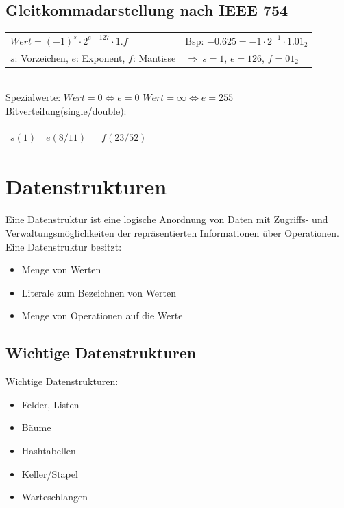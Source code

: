 \documentclass[10pt,a4paper]{scrartcl}
\newcommand{\Ra}[0]{\ensuremath{\Rightarrow}}									%
\begin{document}
	\subsection{Gleitkommadarstellung nach IEEE 754}
	\begin{tabular}{l|l}
		$Wert = (-1)^s \cdot 2^{e-127} \cdot 1.f$ & Bsp: $-0.625 = -1 \cdot 2^{-1} \cdot 1.01_2$\\
		$s$: Vorzeichen, $e$: Exponent, $f$: Mantisse & $\Ra\ s = 1$, $e = 126$, $f = 01_2$\\ 
	\end{tabular}
	\\[0.5em]
	Spezialwerte: $Wert = 0 \Leftrightarrow e=0$ \qquad $Wert = \infty \Leftrightarrow e=255$ \\
	Bitverteilung(single/double):\\
	\begin{tabular}{|c|c|c|} \hline 
		$s(1)$ & \quad $e(8/11)$ \quad\qquad & \qquad\qquad\qquad\ $f(23/52)$ \qquad\qquad\qquad\qquad \\ \hline
	\end{tabular}









\section{Datenstrukturen}
Eine Datenstruktur ist eine logische Anordnung von Daten
mit Zugriffs- und Verwaltungsmöglichkeiten der repräsentierten Informationen über Operationen.\\
Eine Datenstruktur besitzt:\\
\begin{itemize}\itemsep0pt
	\item Menge von Werten
	\item Literale zum Bezeichnen von Werten
	\item Menge von Operationen auf die Werte
\end{itemize}




\subsection{Wichtige Datenstrukturen}
Wichtige Datenstrukturen:\\
\begin{itemize}
	\item Felder, Listen
	\item Bäume
	\item Hashtabellen
	\item Keller/Stapel
	\item Warteschlangen
\end{itemize}
\end{document}
